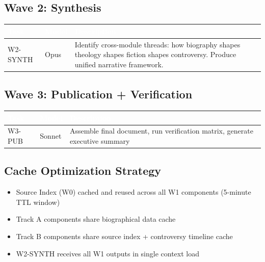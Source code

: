 \documentclass[11pt,letterpaper]{article}
\newcommand{\tableheader}[1]{\textbf{\sffamily\textcolor{white}{#1}}}
\begin{document}
\subsection{Wave 2: Synthesis}

\begin{center}
\begin{tabularx}{\textwidth}{L{3cm}C{1.5cm}X}
\toprule
{}
\tableheader{Task} & \tableheader{Model} & \tableheader{Description} \\
\midrule
W2-SYNTH & Opus & Identify cross-module threads: how biography shapes theology shapes fiction shapes controversy. Produce unified narrative framework. \\
\bottomrule
\end{tabularx}
\end{center}

\subsection{Wave 3: Publication + Verification}

\begin{center}
\begin{tabularx}{\textwidth}{L{3cm}C{1.5cm}X}
\toprule
{}
\tableheader{Task} & \tableheader{Model} & \tableheader{Description} \\
\midrule
W3-PUB & Sonnet & Assemble final document, run verification matrix, generate executive summary \\
\bottomrule
\end{tabularx}
\end{center}

\subsection{Cache Optimization Strategy}

\begin{itemize}[leftmargin=2em]
  \item Source Index (W0) cached and reused across all W1 components (5-minute TTL window)
  \item Track A components share biographical data cache
  \item Track B components share source index + controversy timeline cache
  \item W2-SYNTH receives all W1 outputs in single context load
\end{itemize}
\end{document}
